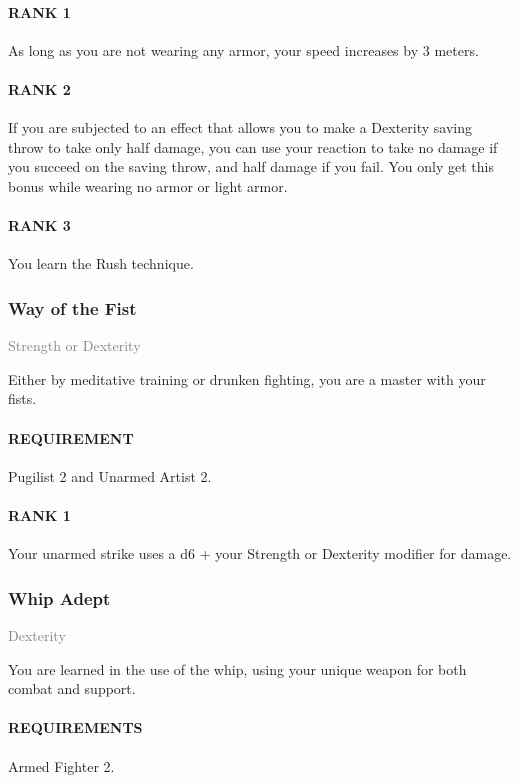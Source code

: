 \paragraph{RANK 1} As long as you are not wearing any armor, your speed increases by 3 meters.
\paragraph{RANK 2} If you are subjected to an effect that allows you to make a Dexterity saving throw to take only half damage, you can use your reaction to take no damage if you succeed on the saving throw, and half damage if you fail.
You only get this bonus while wearing no armor or light armor.
\paragraph{RANK 3} You learn the Rush technique.

\subsubsection{Way of the Fist} \label{feat::wayofthefist}
\small{\textcolor{gray}{Strength or Dexterity}}

\normalsize
Either by meditative training or drunken fighting, you are a master with your fists.
\paragraph{REQUIREMENT} Pugilist 2 and Unarmed Artist 2.
\paragraph{RANK 1} Your unarmed strike uses a d6 + your Strength or Dexterity modifier for damage.

\subsubsection{Whip Adept} \label{feat::whipadept}
\small{\textcolor{gray}{Dexterity}}

\normalsize
You are learned in the use of the whip, using your unique weapon for both combat and support.
\paragraph{REQUIREMENTS} Armed Fighter 2.
